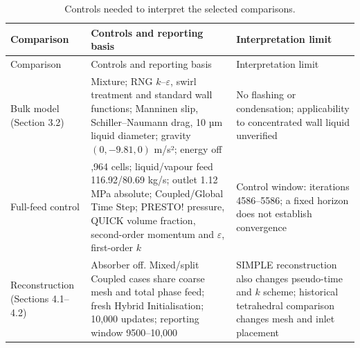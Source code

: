 \documentclass[12pt]{article}
\begin{document}
\begingroup\small\setlength{\tabcolsep}{3pt}
{
\begin{longtable}[]{@{}
  >{\raggedright\arraybackslash}p{}
  >{\raggedright\arraybackslash}p{}
  >{\raggedright\arraybackslash}p{}@{}}
\caption{Controls needed to interpret the selected comparisons.}\label{tab:A1}\tabularnewline
\toprule\noalign{}
\begin{minipage}[b]{\linewidth}\raggedright
Comparison
\end{minipage} & \begin{minipage}[b]{\linewidth}\raggedright
Controls and reporting basis
\end{minipage} & \begin{minipage}[b]{\linewidth}\raggedright
Interpretation limit
\end{minipage} \\
\midrule\noalign{}
\endfirsthead
\toprule\noalign{}
\begin{minipage}[b]{\linewidth}\raggedright
Comparison
\end{minipage} & \begin{minipage}[b]{\linewidth}\raggedright
Controls and reporting basis
\end{minipage} & \begin{minipage}[b]{\linewidth}\raggedright
Interpretation limit
\end{minipage} \\
\midrule\noalign{}
\endhead
\bottomrule\noalign{}
\endlastfoot
Bulk model (Section 3.2) & Mixture; RNG \(k\)--\(\varepsilon\), swirl treatment and standard wall functions; Manninen slip, Schiller--Naumann drag, 10 µm liquid diameter; gravity \((0,-9.81,0)\) m/s²; energy off & No flashing or condensation; applicability to concentrated wall liquid unverified \\
Full-feed control & 60,964 cells; liquid/vapour feed 116.92/80.69 kg/s; outlet 1.12 MPa absolute; Coupled/Global Time Step; PRESTO! pressure, QUICK volume fraction, second-order momentum and \(\varepsilon\), first-order \(k\) & Control window: iterations 4586--5586; a fixed horizon does not establish convergence \\
Reconstruction (Sections 4.1--4.2) & Absorber off. Mixed/split Coupled cases share coarse mesh and total phase feed; fresh Hybrid Initialisation; 10,000 updates; reporting window 9500--10,000 & SIMPLE reconstruction also changes pseudo-time and \(k\) scheme; historical tetrahedral comparison changes mesh and inlet placement \\

\end{longtable}}
\end{document}
